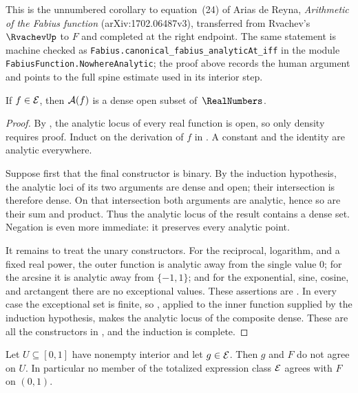 This is the unnumbered corollary to equation~(24) of Arias de Reyna,
\emph{Arithmetic of the Fabius function} (arXiv:1702.06487v3), transferred
from Rvachev's $\RvachevUp$ to $F$ and completed at the right endpoint.  The
same statement is machine checked as
\texttt{Fabius.canonical\_fabius\_analyticAt\_iff} in the module
\texttt{FabiusFunction.NowhereAnalytic}; the proof above records the human
argument and points to the full spine estimate used in its interior step.

\begin{theorem}\label{ne:thm:density}
If $f\in\mathcal E$, then $\mathcal A(f)$ is a dense open subset of~$\RealNumbers$.
\end{theorem}

\begin{proof}
By , the analytic locus of every real function is open, so
only density requires proof.  Induct on the derivation of $f$ in
.  A constant and the identity are analytic everywhere.

Suppose first that the final constructor is binary.  By the induction
hypothesis, the analytic loci of its two arguments are dense and open; their
intersection is therefore dense.  On that intersection both arguments are
analytic, hence so are their sum and product.  Thus the analytic locus of the
result contains a dense set.  Negation is even more immediate: it preserves
every analytic point.

It remains to treat the unary constructors.  For the reciprocal, logarithm,
and a fixed real power, the outer function is analytic away from the single
value $0$; for the arcsine it is analytic away from $\{-1,1\}$; and for the
exponential, sine, cosine, and arctangent there are no exceptional values.
These assertions are .  In every case the exceptional
set is finite, so , applied to the inner function supplied by
the induction hypothesis, makes the analytic locus of the composite dense.
These are all the constructors in , and the induction is
complete.
\end{proof}

\begin{corollary}\label{ne:cor:main}
Let $U\subseteq[0,1]$ have nonempty interior and let $g\in\mathcal E$.  Then $g$
and $F$ do not agree on $U$.  In particular no member of the totalized
expression class $\mathcal E$ agrees with $F$ on $(0,1)$.
\end{corollary}

